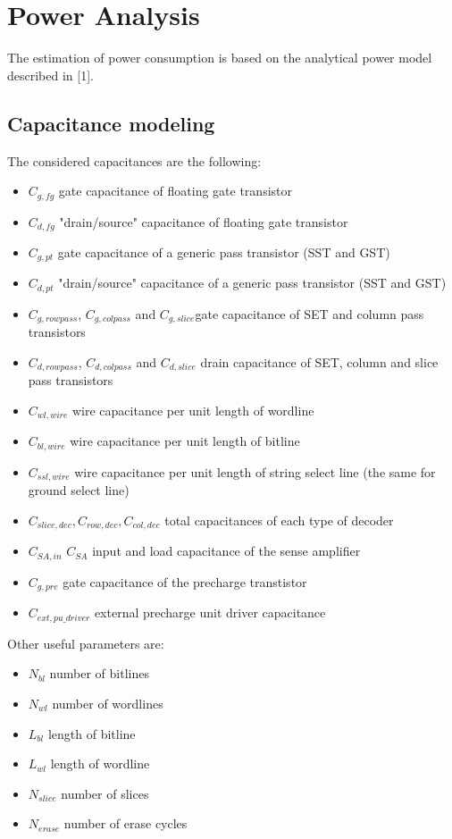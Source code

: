 \chapter{Power Analysis}
\graphicspath{{foto/Chap3/}}

The estimation of power consumption is based on the analytical power
model described in [1].

\section{Capacitance modeling}
The considered capacitances are the following:
\begin{itemize}
	\item $C_{g,fg}$ gate capacitance of floating gate transistor
	\item $C_{d,fg}$ "drain/source" capacitance of floating gate transistor
	\item $C_{g,pt}$ gate capacitance of a generic pass transistor (SST and GST)
	\item $C_{d,pt}$ "drain/source" capacitance of a generic pass transistor (SST and GST)
	\item $C_{g,rowpass}$, $C_{g,colpass}$ and $C_{g,slice}$gate capacitance of SET and column pass transistors
	\item $C_{d,rowpass}$, $C_{d,colpass}$ and $C_{d,slice}$ drain capacitance of SET, column and slice pass transistors 
	\item $C_{wl,wire}$ wire capacitance per unit length of wordline
	\item $C_{bl,wire}$ wire capacitance per unit length of bitline
	\item $C_{ssl,wire}$ wire capacitance per unit length of string select line (the same for ground select line)
	\item $C_{slice,dec},C_{row,dec},C_{col,dec}$ total capacitances of each type of decoder
	\item $C_{SA,in}$ $C_{SA}$ input and load capacitance of the sense amplifier
	\item $C_{g,pre}$ gate capacitance of the precharge transtistor
	\item $C_{ext,pu\_driver}$ external precharge unit driver capacitance
\end{itemize}

Other useful parameters are:

\begin{itemize}
	\item $N_{bl}$ number of bitlines 
	\item $N_{wl}$ number of wordlines
	\item $L_{bl}$ length of bitline 
	\item $L_{wl}$ length of wordline
	\item $N_{slice}$ number of slices
	\item $N_{erase}$ number of erase cycles
\end{itemize}

